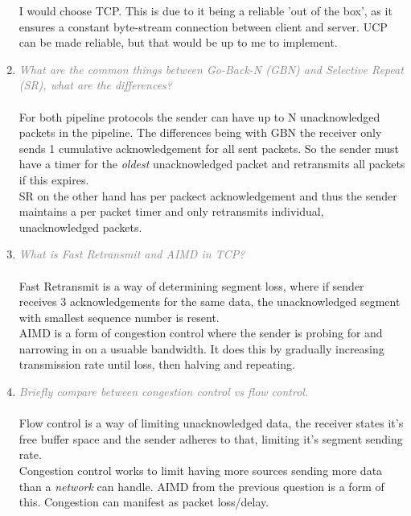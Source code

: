 \documentclass[a4paper,11pt]{article}
\begin{document}
\begin{enumerate}
I would choose TCP. This is due to it being a reliable 'out of the box', as it ensures a constant byte-stream connection between client and server.
UCP can be made reliable, but that would be up to me to implement.
\item
\textcolor{gray}{\textit{What are the common things between Go-Back-N (GBN) and Selective Repeat (SR), what are the differences?}}\\ \\
For both pipeline protocols the sender can have up to N unacknowledged packets in the pipeline. The differences being with GBN the receiver only sends 1 cumulative acknowledgement for all sent packets. So the sender must have a timer for the \textit{oldest} unacknowledged packet and retransmits all packets if this expires.
\\
SR on the other hand has per packect acknowledgement and thus the sender maintains a per packet timer and only retransmits individual, unacknowledged packets.

\item
\textcolor{gray}{\textit{What is Fast Retransmit and AIMD in TCP?}}\\ \\
Fast Retransmit is a way of determining segment loss, where if sender receives 3
acknowledgements for the same data, the unacknowledged segment with smallest sequence number is resent.
\\
AIMD is a form of congestion control where the sender is probing for and narrowing in on a usuable bandwidth. It does this by gradually increasing transmission rate until loss, then halving and repeating.

\item
\textcolor{gray}{\textit{Briefly compare between congestion control vs flow control.}}\\ \\
Flow control is a way of limiting unacknowledged data, the receiver states it's free buffer space and the sender adheres to that, limiting it's segment sending rate.
\\
Congestion control works to limit having more sources sending more data than a \textit{network} can handle. AIMD from the previous question is a form of this. Congestion can manifest as packet loss/delay.

\end{enumerate}
\end{document}
